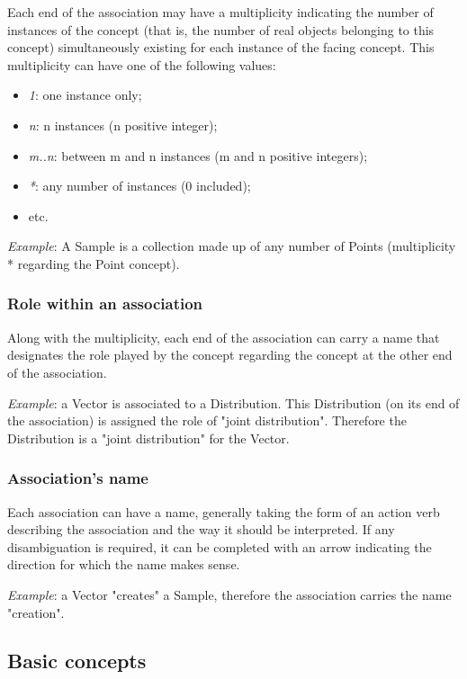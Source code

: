 Each end of the association may have a multiplicity indicating the number of instances of the concept (that is, the number of real objects belonging to this concept) simultaneously existing for each instance of the facing concept. This multiplicity can have one of the following values:
\begin{itemize}
\item \emph{1}: one instance only;
\item \emph{n}: n instances (n positive integer);
\item \emph{m..n}: between m and n instances (m and n positive integers);
\item \emph{*}: any number of instances (0 included);
\item etc.
\end{itemize}

\emph{Example}: A Sample is a collection made up of any number of Points (multiplicity * regarding the Point concept).

\subsubsection{Role within an association}

Along with the multiplicity, each end of the association can carry a name that designates the role played by the concept regarding the concept at the other end of the association.

\emph{Example}: a Vector is associated to a Distribution. This Distribution (on its end of the association) is assigned the role of "joint distribution". Therefore the Distribution is a "joint distribution" for the Vector.

\subsubsection{Association's name}

Each association can have a name, generally taking the form of an action verb describing the association and the way it should be interpreted. If any disambiguation is required, it can be completed with an arrow indicating the direction for which the name makes sense.

\emph{Example}: a Vector "creates" a Sample, therefore the association carries the name "creation".

\subsection{Basic concepts}

